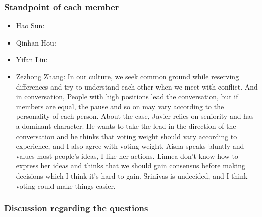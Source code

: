 		\subsubsection{Standpoint of each member}
		\begin{itemize}
  			\item Hao Sun: 
  			\item Qinhan Hou:
  			\item Yifan Liu: 
  			\item Zezhong Zhang: In our culture, we seek common ground while reserving differences and try to understand each other when we meet with conflict. And in conversation, People with high positions lead the conversation, but if members are equal, the pause and so on may vary according to the personality of each person. About the case, Javier relies on seniority and has a dominant character. He wants to take the lead in the direction of the conversation and he thinks that voting weight should vary according to experience, and I also agree with voting weight. Aisha speaks bluntly and values most people’s ideas, I like her actions. Linnea don't know how to express her ideas and thinks that we should gain consensus before making decisions which I think it's hard to gain. Srinivas is undecided, and I think voting could make things easier. 
		\end{itemize}
		\subsubsection{Discussion regarding the questions}